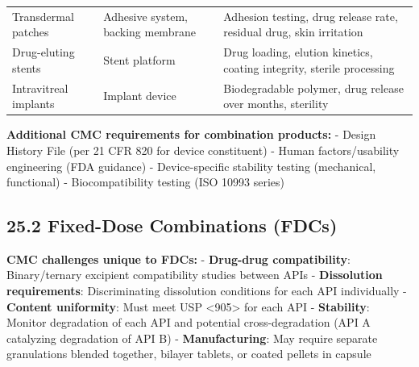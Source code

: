 \documentclass[
  11pt,
  a4paper,
]{report}
\begin{document}
\begin{longtable}[]{@{}lll@{}}
\begin{minipage}[t]{0.24\columnwidth}\raggedright
Transdermal patches\strut
\end{minipage} & \begin{minipage}[t]{0.32\columnwidth}\raggedright
Adhesive system, backing membrane\strut
\end{minipage} & \begin{minipage}[t]{0.35\columnwidth}\raggedright
Adhesion testing, drug release rate, residual drug, skin
irritation\strut
\end{minipage}\tabularnewline
\begin{minipage}[t]{0.24\columnwidth}\raggedright
Drug-eluting stents\strut
\end{minipage} & \begin{minipage}[t]{0.32\columnwidth}\raggedright
Stent platform\strut
\end{minipage} & \begin{minipage}[t]{0.35\columnwidth}\raggedright
Drug loading, elution kinetics, coating integrity, sterile
processing\strut
\end{minipage}\tabularnewline
\begin{minipage}[t]{0.24\columnwidth}\raggedright
Intravitreal implants\strut
\end{minipage} & \begin{minipage}[t]{0.32\columnwidth}\raggedright
Implant device\strut
\end{minipage} & \begin{minipage}[t]{0.35\columnwidth}\raggedright
Biodegradable polymer, drug release over months, sterility\strut
\end{minipage}\tabularnewline
\bottomrule
\end{longtable}

\textbf{Additional CMC requirements for combination products:} - Design
History File (per 21 CFR 820 for device constituent) - Human
factors/usability engineering (FDA guidance) - Device-specific stability
testing (mechanical, functional) - Biocompatibility testing (ISO 10993
series)

\hypertarget{fixed-dose-combinations-fdcs}{%
\subsection{25.2 Fixed-Dose Combinations
(FDCs)}\label{fixed-dose-combinations-fdcs}}

\textbf{CMC challenges unique to FDCs:} - \textbf{Drug-drug
compatibility}: Binary/ternary excipient compatibility studies between
APIs - \textbf{Dissolution requirements}: Discriminating dissolution
conditions for each API individually - \textbf{Content uniformity}: Must
meet USP \textless905\textgreater{} for each API - \textbf{Stability}:
Monitor degradation of each API and potential cross-degradation (API A
catalyzing degradation of API B) - \textbf{Manufacturing}: May require
separate granulations blended together, bilayer tablets, or coated
pellets in capsule
\end{document}
